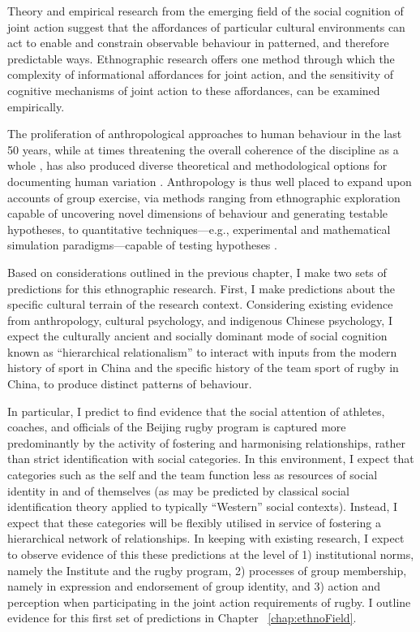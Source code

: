 \begin{CJK}{UTF8}{gbsn}
Theory and empirical research from the emerging field of the social cognition of joint action suggest that the affordances of particular cultural environments can act to enable and constrain observable behaviour in patterned, and therefore predictable ways.   Ethnographic research offers one method through which the complexity of informational affordances for joint action, and the sensitivity of cognitive mechanisms of joint action to these affordances, can be examined empirically.

The proliferation of anthropological approaches to human behaviour in the last 50 years, while at times threatening the overall coherence of the discipline as a whole \citep{Beller2012}, has also produced diverse theoretical and methodological options for documenting human variation \citep{Fuentes2016a}.  Anthropology is thus well placed to expand upon accounts of group exercise, via methods ranging from ethnographic exploration capable of uncovering novel dimensions of behaviour and generating testable hypotheses, to quantitative techniques---e.g., experimental and mathematical simulation paradigms---capable of testing hypotheses \citep{Epstein2006,Fuentes2016}.

Based on considerations outlined in the previous chapter, I make two sets of predictions for this ethnographic research.  First, I make predictions about the specific cultural terrain of the research context.  Considering existing evidence from anthropology, cultural psychology, and indigenous Chinese psychology, I expect the culturally ancient and socially dominant mode of social cognition known as ``hierarchical relationalism'' to interact with inputs from the modern history of sport in China and the specific history of the team sport of rugby in China, to produce distinct patterns of behaviour.

In particular, I predict to find evidence that the social attention of athletes, coaches, and officials of the Beijing rugby program is captured more predominantly by the activity of fostering and harmonising relationships, rather than strict identification with social categories.  In this environment, I expect that categories such as the self and the team function less as resources of social identity in and of themselves (as may be predicted by classical social identification theory applied to typically ``Western'' social contexts).  Instead, I expect that these categories will be flexibly utilised in service of fostering a hierarchical network of relationships.  In keeping with existing research, I expect to observe evidence of this these predictions at the level of 1) institutional norms, namely the Institute and the rugby program, 2) processes of group membership, namely in expression and endorsement of group identity, and 3) action and perception when participating in the joint action requirements of rugby.  I outline evidence for this first set of predictions in Chapter ~\ref{chap:ethnoField}.


\end{CJK}
